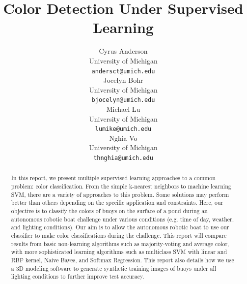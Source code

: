 \documentclass{article} %
\title{Color Detection Under Supervised Learning}
\author{
Cyrus Anderson \\
University of Michigan \\
\texttt{andersct@umich.edu} \\
\And
Jocelyn Bohr \\
University of Michigan \\
\texttt{bjocelyn@umich.edu} \\
\AND
Michael Lu \\
University of Michigan \\
\texttt{lumike@umich.edu} \\
\And
Nghia Vo \\
University of Michigan \\
\texttt{thnghia@umich.edu} \\
}
\begin{document}
\maketitle

\begin{abstract}
In this report, we present multiple supervised learning approaches to a common problem: color classification. From the simple k-nearest neighbors to machine learning SVM, there are a variety of approaches to this problem. Some solutions may perform better than others depending on the specific application and constraints. Here, our objective is to classify the colors of buoys on the surface of a pond during an autonomous robotic boat challenge under various conditions (e.g. time of day, weather, and lighting conditions). Our aim is to allow the autonomous robotic boat to use our classifier to make color classifications during the challenge. This report will compare results from basic non-learning algorithms such as majority-voting and average color, with more sophisticated learning algorithms such as multiclass SVM with linear and RBF kernel, Naive Bayes, and Softmax Regression. This report also details how we use a 3D modeling software to generate synthetic training images of buoys under all lighting conditions to further improve test accuracy. 
\end{abstract}
\end{document}
